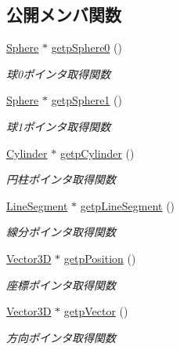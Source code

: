 \subsection*{公開メンバ関数}
\begin{DoxyCompactItemize}
\item 
\mbox{\hyperlink{class_sphere}{Sphere}} $\ast$ \mbox{\hyperlink{class_capsule_ad6590760125ad1b564bcd00fc9c0272e}{getp\+Sphere0}} ()
\begin{DoxyCompactList}\small\item\em 球0ポインタ取得関数 \end{DoxyCompactList}\item 
\mbox{\hyperlink{class_sphere}{Sphere}} $\ast$ \mbox{\hyperlink{class_capsule_a3abd8375914c3ae6c5ff8ad585988d57}{getp\+Sphere1}} ()
\begin{DoxyCompactList}\small\item\em 球1ポインタ取得関数 \end{DoxyCompactList}\item 
\mbox{\hyperlink{class_cylinder}{Cylinder}} $\ast$ \mbox{\hyperlink{class_capsule_a86fceb506f99d999cec56a5c316a5c7a}{getp\+Cylinder}} ()
\begin{DoxyCompactList}\small\item\em 円柱ポインタ取得関数 \end{DoxyCompactList}\item 
\mbox{\hyperlink{class_line_segment}{Line\+Segment}} $\ast$ \mbox{\hyperlink{class_capsule_aadd6a7e5e20796e3f591b83cc406070e}{getp\+Line\+Segment}} ()
\begin{DoxyCompactList}\small\item\em 線分ポインタ取得関数 \end{DoxyCompactList}\item 
\mbox{\hyperlink{class_vector3_d}{Vector3D}} $\ast$ \mbox{\hyperlink{class_capsule_ab0f3be95228fef65ef04d444aa5bcddd}{getp\+Position}} ()
\begin{DoxyCompactList}\small\item\em 座標ポインタ取得関数 \end{DoxyCompactList}\item 
\mbox{\hyperlink{class_vector3_d}{Vector3D}} $\ast$ \mbox{\hyperlink{class_capsule_a93bb5298cb7f9f8ab27e08825bcb2f76}{getp\+Vector}} ()
\begin{DoxyCompactList}\small\item\em 方向ポインタ取得関数 \end{DoxyCompactList}\item 

\end{DoxyCompactItemize}
